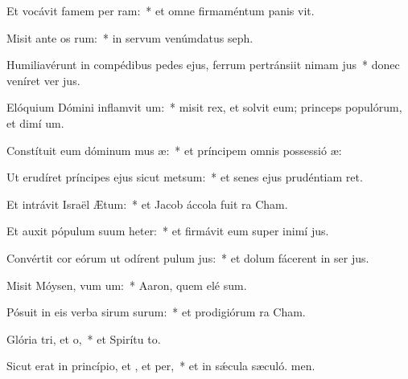 \item Et vocávit famem per ram:~* et omne firmaméntum panis vit.
\item Misit ante os rum:~* in servum venúmdatus  seph.
\item Humiliavérunt in compédibus pedes ejus, ferrum pertránsiit nimam jus~* donec veníret ver jus.
\item Elóquium Dómini inflamvit um:~* misit rex, et solvit eum; princeps populórum, et dimí um.
\item Constítuit eum dóminum mus æ:~* et príncipem omnis possessió æ:
\item Ut erudíret príncipes ejus sicut metsum:~* et senes ejus prudéntiam ret.
\item Et intrávit Israël  Ætum:~* et Jacob áccola fuit  ra Cham.
\item Et auxit pópulum suum heter:~* et firmávit eum super inimí jus.
\item Convértit cor eórum ut odírent pulum jus:~* et dolum fácerent in ser jus.
\item Misit Móysen, vum um:~* Aaron, quem elé sum.
\item Pósuit in eis verba sirum surum:~* et prodigiórum  ra Cham.
\item Glória tri, et o,~* et Spirítu to.
\item Sicut erat in princípio, et , et per,~* et in sǽcula sæculó. men.

